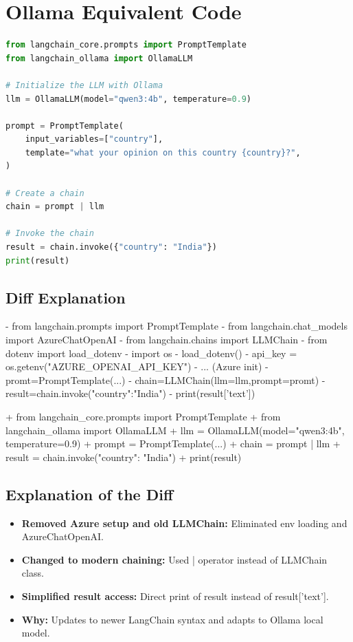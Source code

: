 \documentclass[11pt, a4paper]{article}
\begin{document}
\section{Ollama Equivalent Code}
\begin{lstlisting}[language=Python]
from langchain_core.prompts import PromptTemplate
from langchain_ollama import OllamaLLM

# Initialize the LLM with Ollama
llm = OllamaLLM(model="qwen3:4b", temperature=0.9)

prompt = PromptTemplate(
    input_variables=["country"],
    template="what your opinion on this country {country}?",
)

# Create a chain
chain = prompt | llm

# Invoke the chain
result = chain.invoke({"country": "India"})
print(result)
\end{lstlisting}

\subsection{Diff Explanation}
\begin{removedcode}
\begin{diffverb}
- from langchain.prompts import PromptTemplate
- from langchain.chat_models import AzureChatOpenAI
- from langchain.chains import LLMChain
- from dotenv import load_dotenv
- import os
- load_dotenv()
- api_key = os.getenv("AZURE_OPENAI_API_KEY")
- ... (Azure init)
- promt=PromptTemplate(...)
- chain=LLMChain(llm=llm,prompt=promt)
- result=chain.invoke({"country":"India"})
- print(result['text'])
\end{diffverb}
\end{removedcode}

\begin{addedcode}
\begin{diffverb}
+ from langchain_core.prompts import PromptTemplate
+ from langchain_ollama import OllamaLLM
+ llm = OllamaLLM(model="qwen3:4b", temperature=0.9)
+ prompt = PromptTemplate(...)
+ chain = prompt | llm
+ result = chain.invoke({"country": "India"})
+ print(result)
\end{diffverb}
\end{addedcode}


\subsection{Explanation of the Diff}
\begin{itemize}
    \item \textbf{Removed Azure setup and old LLMChain:} Eliminated env loading and AzureChatOpenAI.
    \item \textbf{Changed to modern chaining:} Used | operator instead of LLMChain class.
    \item \textbf{Simplified result access:} Direct print of result instead of result['text'].
    \item \textbf{Why:} Updates to newer LangChain syntax and adapts to Ollama local model.
\end{itemize}
\end{document}
